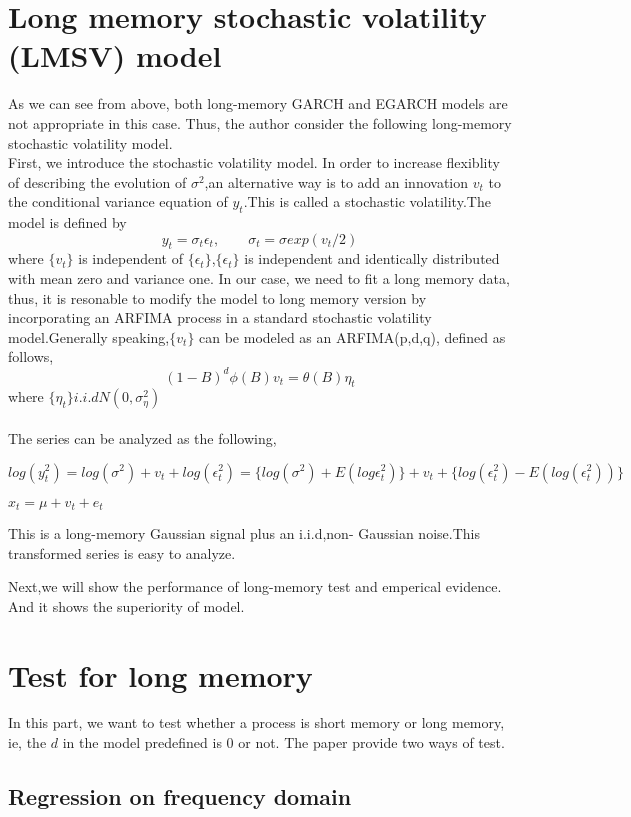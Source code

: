 \documentclass[10pt,a4paper]{article}
\begin{document}
\section{Long memory stochastic volatility (LMSV) model}
As we can see from above, both long-memory GARCH and EGARCH models are not appropriate in this case. Thus, the author consider the following long-memory stochastic volatility model. \\
First, we introduce the stochastic volatility model. 
In order to increase flexiblity of describing the evolution of $\sigma^2$,an alternative way is to add an innovation $v_t$ to the conditional variance equation of $y_t$.This is called a stochastic volatility.The model is defined by
$$y_t=\sigma_t\epsilon_t, \qquad \sigma_t=\sigma exp(v_t/2)$$
where {$\{v_t\}$} is independent of {$\{\epsilon_t\}$},{$\{\epsilon_t\}$} is independent and identically distributed with mean zero and variance one.
In our case, we need to fit a long memory data, thus, it is resonable to modify the model to long memory version by incorporating an ARFIMA process in a standard stochastic volatility model.Generally speaking,$\{v_t\}$ can be modeled as an ARFIMA(p,d,q),\cite{baillie1996long} defined as follows,
$$(1-B)^d\phi(B)v_t=\theta(B)\eta_t$$
where $\{\eta_t\} i.i.d N(0,\sigma_\eta^2)$ \\\\
The series can be analyzed as the following,
\begin{center}$\displaystyle log(y^2_t)=log(\sigma^2)+v_t+log(\epsilon^2_t)=\{log(\sigma^2)+E(log\epsilon^2_t)\}+v_t+\{log(\epsilon^2_t)-E(log(\epsilon^2_t))\}$\end{center}
\begin{center} $\displaystyle x_t=\mu+v_t+e_t$\end{center}
This is a long-memory Gaussian signal plus an i.i.d,non- Gaussian noise.This transformed series is easy to analyze.

Next,we will show the performance of long-memory test and emperical evidence. And it shows the superiority of model.
\section{Test for long memory}
In this part, we want to test whether a process is short 
 memory or long memory, ie, the $d$ in the model predefined is 0 or not. The paper provide two ways of test.
\subsection{Regression on frequency domain}
\end{document}

